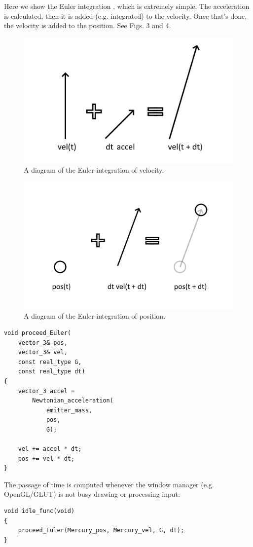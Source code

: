 \documentclass[12pt]{article}
\begin{document}
Here we show the Euler integration \cite{fiedler2}, which is extremely simple.
The acceleration is calculated, then it is added (e.g. integrated) to the velocity.
Once that's done, the velocity is added to the position.
See Figs. 3 and 4.
\begin{figure} 
\centering
\label{fig3}
  \includegraphics[width = 4 in]{velocity.png}
  \caption{
A diagram of the Euler integration of velocity.
}
\end{figure}
\begin{figure} 
\centering
\label{fig4}
  \includegraphics[width = 4 in]{position.png}
  \caption{
A diagram of the Euler integration of position.
}
\end{figure}

\begin{lstlisting}
void proceed_Euler(
	vector_3& pos, 
	vector_3& vel, 
	const real_type G, 
	const real_type dt)
{
	vector_3 accel = 
		Newtonian_acceleration(
			emitter_mass, 
			pos, 
			G);

	vel += accel * dt;
	pos += vel * dt;
}

\end{lstlisting}

The passage of time is computed whenever the window manager (e.g. OpenGL/GLUT) is not busy drawing or processing input:
\begin{lstlisting}
void idle_func(void)
{
	proceed_Euler(Mercury_pos, Mercury_vel, G, dt);
}
\end{lstlisting}
\end{document}
